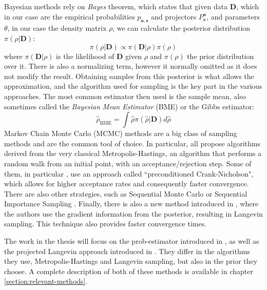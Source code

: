 \documentclass[12pt]{memoir}
\newcommand{\mb}{\mathbf}
\newcommand{\ti}{\textit}
\begin{document}
Bayesian methods rely on \ti{Bayes} theorem, which states that given data $\mb{D}$, which in our case are the empirical probabilities $p_{\mb a, \mb s}$ and projectors $P^{\mb a}_{\mb s}$, and parameters $\theta$, in our case the density matrix $\rho$, we can calculate the posterior distribution $\pi(\rho|\mb{D})$:
\begin{equation}
    \pi(\rho|\mb{D}) \propto \pi(\mb{D}|\rho) \pi(\rho)
\end{equation}
where $\pi(\mb{D}|\rho)$ is the likelihood of $\mb{D}$ given $\rho$ and $\pi(\rho)$ the prior distribution over it. There is also a normalizing term, however it normally omitted as it does not modify the result. Obtaining samples from this posterior is what allows the approximation, and the algorithm used for sampling is the key part in the various approaches. The most common estimator then used is the sample mean, also sometimes called the \ti{Bayesian Mean Estimator} (BME) or the Gibbs estimator:
\begin{equation}
    \hat \rho_{\text{BME}} = \int \hat \rho \pi(\hat \rho|\mb D) d\hat \rho
\end{equation}
Markov Chain Monte Carlo (MCMC) methods are a big class of sampling methods and are the common tool of choice. In particular, \cite{MA17,Mai22,meth:bayesian:mh:Cotter2013, LLJL20, meth:bayesian:mh:Blume-Kohout-2010} all propose algorithms derived from the very classical Metropolis-Hastings, an algorithm that performs a random walk from an initial point, with an acceptance/rejection step. Some of them, in particular \cite{Mai22,meth:bayesian:mh:Cotter2013, LLJL20}, use an approach called ``preconditioned Crank-Nicholson", which allows for higher acceptance rates and consequently faster convergence. There are also other strategies, such as Sequential Monte Carlo \cite{meth:bayesian:smc:Ferrie-2014,meth:bayesian:smc:Kueng-2015, meth:bayesian:smc:Granade_2016} or Sequential Importance Sampling \cite{meth:bayesian:sis:Kravtsov-2013}. Finally, there is also a new method introduced in \cite{meth:bayesian:Langevin:ACMT2024}, where the authors use the gradient information from the posterior, resulting in Langevin sampling. This technique also provides faster convergence times.\medbreak

The work in the thesis will focus on the prob-estimator introduced in \cite{MA17}, as well as the projected Langevin approach introduced in \cite{meth:bayesian:Langevin:ACMT2024}. They differ in the algorithms they use, Metropolis-Hastings and Langevin sampling, but also in the prior they choose. A complete description of both of these methods is available in chapter \ref{section:relevant-methods}.
\end{document}
